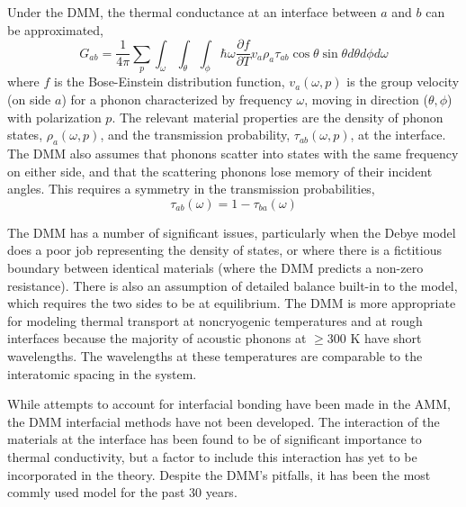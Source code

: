 Under the DMM, the thermal conductance at an interface between $a$ and $b$ can be approximated,  
\begin{equation}
G_{ab} = \frac{1}{4 \pi} \sum_p \int_\omega \int_\theta \int_\phi \hbar \omega \frac{\partial f}{\partial T}  v_a  \rho_a  \tau_{ab} \cos\theta \sin\theta d\theta d\phi d\omega
\end{equation}
where $f$ is the Bose-Einstein distribution function, $v_a(\omega, p)$ is the group velocity (on side $a$) for a phonon characterized by frequency $\omega$, moving in direction ($\theta, \phi$) with polarization $p$.  The relevant material properties are the density of phonon states, $\rho_a(\omega, p)$, and the transmission probability, $\tau_{ab}(\omega, p)$, at the interface.\cite{Swartz:1989uq,Reddy:2005fk,Monachon2016}  The DMM also assumes that phonons scatter into states with the same frequency on either side, and that the scattering phonons lose memory of their incident angles.  This requires a symmetry in the transmission probabilities,
\begin{equation}
\tau_{ab}(\omega) = 1 - \tau_{ba}(\omega)
\end{equation}

The DMM has a number of significant issues, particularly when the Debye model does a poor job representing the density of states, or where there is a fictitious boundary between identical materials (where the DMM predicts a non-zero resistance).\cite{Monachon2016}  There is also an assumption of detailed balance built-in to the model,\cite{Chen2005} which requires the two sides to be at equilibrium.
The DMM is more appropriate for modeling thermal transport at noncryogenic temperatures and at rough interfaces because the majority of acoustic phonons at $\geq$300 K have short wavelengths. The wavelengths at these temperatures are comparable to the interatomic spacing in the system.

While attempts to account for interfacial bonding have been made in the AMM, the DMM interfacial methods have not been developed.
The interaction of the materials at the interface has been found to be of significant importance to thermal conductivity\cite{Beechem2007, Hopkins-surf-rough, Hopkins-inelastic}, but a factor to include this interaction has yet to be incorporated in the theory.
Despite the DMM's pitfalls, it has been the most commly used model for the past 30 years. \cite{Cahill2006, Stoner1993, Stevens2005, Cahill2011}

